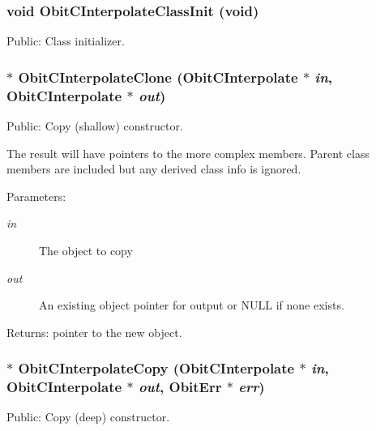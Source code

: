 \subsubsection{\setlength{\rightskip}{0pt plus 5cm}void Obit\-CInterpolate\-Class\-Init (void)}\label{ObitCInterpolate_8h_a3}


Public: Class initializer. 

\subsubsection{$\ast$ Obit\-CInterpolate\-Clone ({\bf Obit\-CInterpolate} $\ast$ {\em in}, {\bf Obit\-CInterpolate} $\ast$ {\em out})}\label{ObitCInterpolate_8h_a8}


Public: Copy (shallow) constructor. 

The result will have pointers to the more complex members. Parent class members are included but any derived class info is ignored. \begin{Desc}
\item[Parameters:]
\begin{description}
\item[{\em in}]The object to copy \item[{\em out}]An existing object pointer for output or NULL if none exists. \end{description}
\end{Desc}
\begin{Desc}
\item[Returns:]pointer to the new object. \end{Desc}
\subsubsection{$\ast$ Obit\-CInterpolate\-Copy ({\bf Obit\-CInterpolate} $\ast$ {\em in}, {\bf Obit\-CInterpolate} $\ast$ {\em out}, {\bf Obit\-Err} $\ast$ {\em err})}\label{ObitCInterpolate_8h_a7}


Public: Copy (deep) constructor. 

